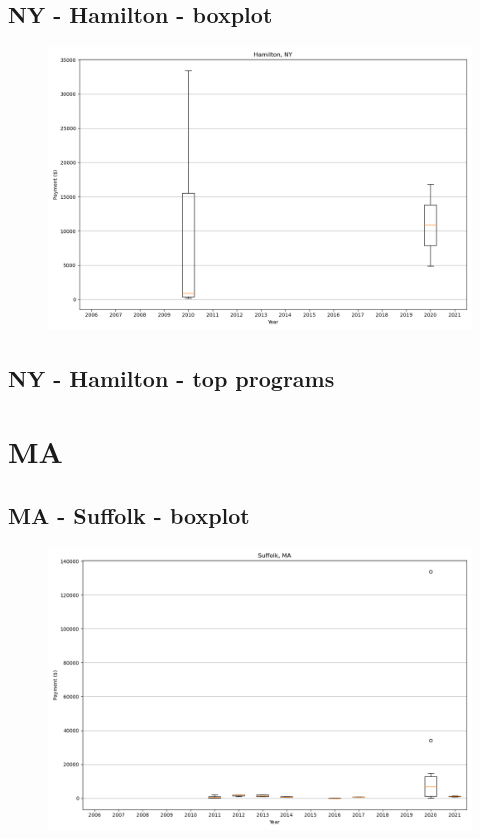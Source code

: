 \subsection*{NY - Hamilton - boxplot}
\begin{figure}[h]
\centering
\includegraphics[width=7in]{../output/boxplots/counties/Hamilton-NY_boxplot.png}
\end{figure}


\subsection*{NY - Hamilton - top programs}

\newpage
\section*{MA}
\subsection*{MA - Suffolk - boxplot}
\begin{figure}[h]
\centering
\includegraphics[width=7in]{../output/boxplots/counties/Suffolk-MA_boxplot.png}
\end{figure}


